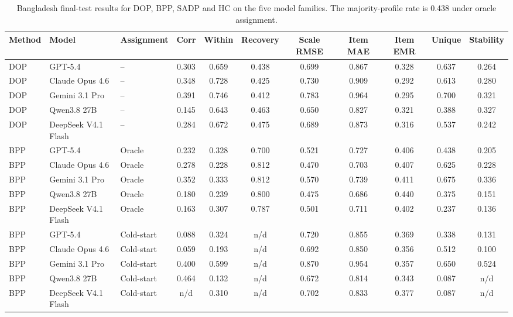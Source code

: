 \begin{table}[pos=!htbp]
\scriptsize\centering\setlength{\tabcolsep}{2.5pt}
\caption{Bangladesh final-test results for DOP, BPP, SADP and HC on the five model families. The majority-profile rate is 0.438 under oracle assignment.}
\label{tab:grid-bd}
\begin{tabular*}{\textwidth}{@{\extracolsep{\fill}}lllcccccccc@{}}
\toprule
Method & Model & Assignment & Corr & Within & Recovery & Scale RMSE & Item MAE & Item EMR & Unique & Stability \\
\midrule
DOP & GPT-5.4 & -- & 0.303 & 0.659 & 0.438 & 0.699 & 0.867 & 0.328 & 0.637 & 0.264 \\
DOP & Claude Opus 4.6 & -- & 0.348 & 0.728 & 0.425 & 0.730 & 0.909 & 0.292 & 0.613 & 0.280 \\
DOP & Gemini 3.1 Pro & -- & 0.391 & 0.746 & 0.412 & 0.783 & 0.964 & 0.295 & 0.700 & 0.321 \\
DOP & Qwen3.8 27B & -- & 0.145 & 0.643 & 0.463 & 0.650 & 0.827 & 0.321 & 0.388 & 0.327 \\
DOP & DeepSeek V4.1 Flash & -- & 0.284 & 0.672 & 0.475 & 0.689 & 0.873 & 0.316 & 0.537 & 0.242 \\
\addlinespace[2pt]
BPP & GPT-5.4 & Oracle & 0.232 & 0.328 & 0.700 & 0.521 & 0.727 & 0.406 & 0.438 & 0.205 \\
BPP & Claude Opus 4.6 & Oracle & 0.278 & 0.228 & 0.812 & 0.470 & 0.703 & 0.407 & 0.625 & 0.228 \\
BPP & Gemini 3.1 Pro & Oracle & 0.352 & 0.333 & 0.812 & 0.570 & 0.739 & 0.411 & 0.675 & 0.336 \\
BPP & Qwen3.8 27B & Oracle & 0.180 & 0.239 & 0.800 & 0.475 & 0.686 & 0.440 & 0.375 & 0.151 \\
BPP & DeepSeek V4.1 Flash & Oracle & 0.163 & 0.307 & 0.787 & 0.501 & 0.711 & 0.402 & 0.237 & 0.136 \\
BPP & GPT-5.4 & Cold-start & 0.088 & 0.324 & n/d & 0.720 & 0.855 & 0.369 & 0.338 & 0.131 \\
BPP & Claude Opus 4.6 & Cold-start & 0.059 & 0.193 & n/d & 0.692 & 0.850 & 0.356 & 0.512 & 0.100 \\
BPP & Gemini 3.1 Pro & Cold-start & 0.400 & 0.599 & n/d & 0.870 & 0.954 & 0.357 & 0.650 & 0.524 \\
BPP & Qwen3.8 27B & Cold-start & 0.464 & 0.132 & n/d & 0.672 & 0.814 & 0.343 & 0.087 & n/d \\
BPP & DeepSeek V4.1 Flash & Cold-start & n/d & 0.310 & n/d & 0.702 & 0.833 & 0.377 & 0.087 & n/d \\

\end{tabular*}
\end{table}
